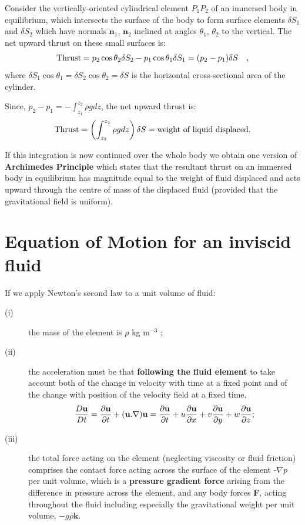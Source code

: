 \documentclass[10pt]{report}
\begin{document}
Consider the vertically-oriented cylindrical element $P_{1} P_{2}$ of an
immersed body in equilibrium, which intersects the surface of the body to
form surface elements $\delta S_{1}$ and $\delta S_{2}$ which have
normals $\textbf{n}_{1}$, $\textbf{n}_{2}$ inclined at angles $\theta _1$,
$\theta _2 $ to the vertical. The net upward thrust on these small
surfaces is:
\[
\hbox{Thrust} =p_2 \cos \theta _2 \delta S_2 -p_1 \cos \theta _1
\delta S_1 =(p_2 -p_1 )\delta S\quad ,
\]
where $\delta S_{1} \cos \theta _{1 }=\delta S_{2} \cos \theta
_{2}=\delta S$ is the horizontal cross-sectional area of the cylinder.

Since, $p_2 -p_1 =-\int_{z_1 }^{z_2 } {\rho gdz} $,
the net upward thrust is:
\[\hbox{Thrust}=\left( {\int_{z_2 }^{z_1 } {\rho gdz} }
\right)\delta S = \hbox{weight of liquid displaced}. \]

If this integration is now continued over the whole body we obtain one
version of \textbf{Archimedes Principle} which states that the resultant
thrust on an immersed body in equilibrium has magnitude equal to the weight
of fluid displaced and acts upward through the centre of mass of the
displaced fluid (provided that the gravitational field is uniform).

\section{Equation of Motion for an inviscid fluid}
If we apply Newton's second law to a unit volume of fluid:
\begin{description}
\item[(i)] the mass of the element is $\rho $ kg m$^{-3}$ ;
\item[(ii)] the acceleration must be that \textbf{following the fluid element} to
take account both of the change in velocity with time at a fixed point and
of the change with position of the velocity field at a fixed time,
\[
\frac{D{{\bf u}}}{Dt}=\frac{\partial {{\bf u}}}{\partial
t}+({{\bf u}}. \nabla ){{\bf
u}}=\frac{\partial {{\bf u}}}{\partial
t}+u\frac{\partial {{\bf u}}}{\partial
x}+v\frac{\partial {{\bf u}}}{\partial
y}+w\frac{\partial {{\bf u}}}{\partial z};
\]
\item[(iii)] the total force acting on the element (neglecting viscosity or fluid
friction) comprises the contact force acting across the surface of the
element -$\nabla p$ per unit volume, which is a \textbf{pressure gradient
force} arising from the difference in pressure across the element, and any
body forces \textbf{F}, acting throughout the fluid including especially the
gravitational weight per unit volume, $-g\rho \textbf{k}$.
\end{description}
\end{document}
